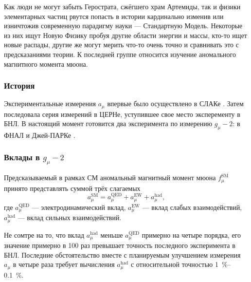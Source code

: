 Как люди не могут забыть Герострата, сжёгшего храм Артемиды, так и физики
элементарных частиц рвутся попасть в истории кардинально изменив или
изничтожив современную парадигму науки --- Стандартную Модель. Некоторые
из них ищут Новую Физику пробуя другие области энергии и массы, кто-то
ищет новые распады, другие же могут мерить что-то очень точно и
сравнивать это с предсказаниями теории.
К последней группе относится изучение аномального магнитного момента мюона.

\subsubsection{История}\label{g-2-history}

Экспериментальные измерения $a_\mu$ впервые было осуществлено в СЛАКе \cite{Garwin:1960zz}.
Затем последовала серия измерений в ЦЕРНе, уступившее свое место эксперементу в БНЛ.
В настоящий момент готовится два эксперимента по измерению $g_\mu-2$: в ФНАЛ \cite{Grange:2015fou} и Джей-ПАРКе \cite{Saito:2012zz}.


\subsubsection{Вклады в \texorpdfstring{$g_\mu-2$}{muon g-2}}
\label{contribution-to-g-2}

Предсказываемый в рамках СМ аномальный магнитный момент мюона $f_\mu^{\text{SM}}$ принято представлять суммой трёх слагаемых
\begin{equation}
    a_\mu^{\text{SM}} = a_\mu^{\text{QED}} + a_\mu^{\text{EW}} + a_\mu^{\text{had}},
\end{equation}
где $a_\mu^{\text{QED}}$ --- электродинамический вклад,
$a_\mu^{\text{EW}}$ --- вклад слабых взаимодействий,
$a_\mu^{\text{had}}$ --- вклад сильных взаимодействий.

Не сомтре на то, что вклад $a_\mu^{\text{had}}$ меньше $a_\mu^{\text{QED}}$ примерно на четыре порядка,
его значение примерно в 100 раз превышает точность последного эксперимента в БНЛ.
Последние обстоятельство вместе с планируемым улучшением измерения $a_\mu$ в четыре раза
требует вычисления $a_\mu^{\text{had}}$ с относительной точностью \SIrange{1}{0.1}{\percent}.

